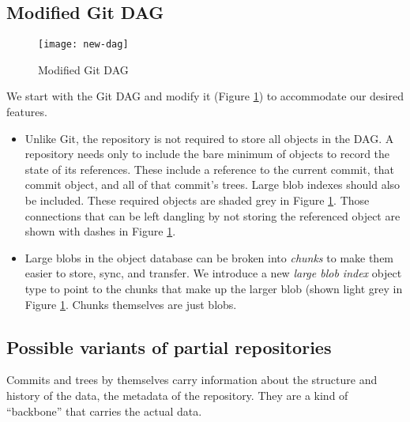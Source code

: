 \documentclass[a4paper]{article}
\newcommand{\newterm}{\textit}
\begin{document}
\subsection{Modified Git DAG}

\begin{figure}[h!]
    \caption{Modified Git DAG}
    \label{fig:new-dag}
    \centering
        \texttt{[image: new-dag]}
\end{figure}

We start with the Git DAG and modify it (Figure \ref{fig:new-dag}) to
accommodate our desired features.

\begin{itemize}
    \item
        Unlike Git, the repository is not required to store all objects in the
        DAG. A repository needs only to include the bare minimum of objects to
        record the state of its references. These include a reference to the
        current commit, that commit object, and all of that commit's trees.
        Large blob indexes should also be included. These required objects are
        shaded grey in Figure \ref{fig:new-dag}. Those connections that can be
        left dangling by not storing the referenced object are shown with dashes
        in Figure \ref{fig:new-dag}.
    \item
        Large blobs in the object database can be broken into \newterm{chunks}
        to make them easier to store, sync, and transfer. We introduce a new
        \newterm{large blob index} object type to point to the chunks that make
        up the larger blob (shown light grey in Figure \ref{fig:new-dag}.
        Chunks themselves are just blobs.
\end{itemize}


\subsection{Possible variants of partial repositories}

Commits and trees by themselves carry information about the structure and
history of the data, the metadata of the repository. They are a kind of
``backbone'' that carries the actual data.
\end{document}
